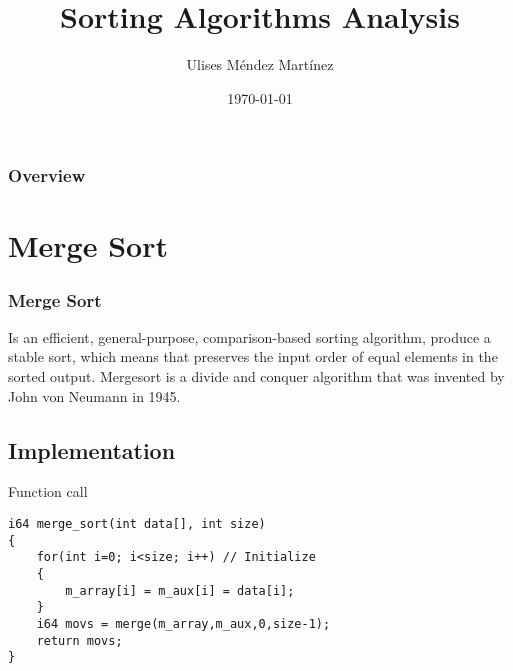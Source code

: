 \documentclass{beamer}
\title[Sorting Algorithms]{Sorting Algorithms Analysis} %
\author{Ulises M\'endez Mart\'{i}nez} %
\institute[UTM] %
{
Design and Analysis of Algorithms 2016-01 \\ %
\medskip
\textit{ulisesmdzmtz@gmail.com} %
}
\date{\today} %
\begin{document}
\begin{frame}
\titlepage %
\end{frame}


\begin{frame}
\frametitle{Overview} %
\tableofcontents %
\end{frame}

\section{Merge Sort} 


\begin{frame}[fragile]

\frametitle{Merge Sort}

Is an efficient, general-purpose, comparison-based sorting algorithm, produce a stable sort, which means that preserves the input order of equal elements in the sorted output. Mergesort is a divide and conquer algorithm that was invented by John von Neumann in 1945.
\subsection{Implementation} 
\begin{block}{Function call}
\begin{lstlisting}
i64 merge_sort(int data[], int size)
{
    for(int i=0; i<size; i++) // Initialize
    {
        m_array[i] = m_aux[i] = data[i];
    }
    i64 movs = merge(m_array,m_aux,0,size-1);
    return movs;
}
\end{lstlisting}
\end{block}
\end{frame}
\end{document}
